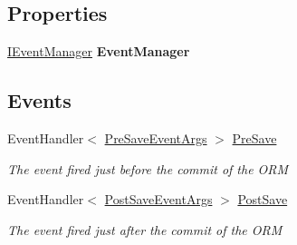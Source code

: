\subsection*{Properties}
\begin{DoxyCompactItemize}
\item 
\hypertarget{class_highway_1_1_data_1_1_entity_framework_1_1_tests_1_1_unit_tests_1_1_commit_events_mock_context_a227d81eb37b9f6d70c70ed90251b210e}{\hyperlink{interface_highway_1_1_data_1_1_interfaces_1_1_i_event_manager}{I\-Event\-Manager} {\bfseries Event\-Manager}}\label{class_highway_1_1_data_1_1_entity_framework_1_1_tests_1_1_unit_tests_1_1_commit_events_mock_context_a227d81eb37b9f6d70c70ed90251b210e}

\end{DoxyCompactItemize}
\subsection*{Events}
\begin{DoxyCompactItemize}
\item 
Event\-Handler$<$ \hyperlink{class_highway_1_1_data_1_1_interceptors_1_1_events_1_1_pre_save_event_args}{Pre\-Save\-Event\-Args} $>$ \hyperlink{class_highway_1_1_data_1_1_entity_framework_1_1_tests_1_1_unit_tests_1_1_commit_events_mock_context_aa0f16907356bb3a01e37d470e929c88a}{Pre\-Save}
\begin{DoxyCompactList}\small\item\em The event fired just before the commit of the O\-R\-M \end{DoxyCompactList}\item 
Event\-Handler$<$ \hyperlink{class_highway_1_1_data_1_1_interceptors_1_1_events_1_1_post_save_event_args}{Post\-Save\-Event\-Args} $>$ \hyperlink{class_highway_1_1_data_1_1_entity_framework_1_1_tests_1_1_unit_tests_1_1_commit_events_mock_context_acc706858c7a83909f5ec24ae9829add8}{Post\-Save}
\begin{DoxyCompactList}\small\item\em The event fired just after the commit of the O\-R\-M \end{DoxyCompactList}\end{DoxyCompactItemize}


